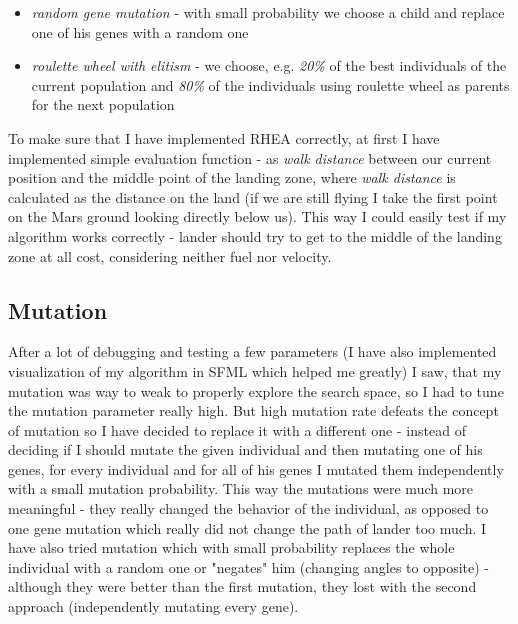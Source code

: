 \documentclass[11pt]{article}
\begin{document}
	\begin{itemize}
		\item \textit{random gene mutation} - with small probability we choose a child and replace one of his genes with a random one
		\item \textit{roulette wheel with elitism} - we choose, e.g. \textit{20\%} of the best individuals of the current population and \textit{80\%} of the individuals using roulette wheel as parents for the next population
	\end{itemize}
	
	To make sure that I have implemented RHEA correctly, at first I have implemented simple evaluation function - as \textit{walk distance} between our current position and the middle point of the landing zone, where \textit{walk distance} is calculated as the distance on the land (if we are still flying I take the first point on the Mars ground looking directly below us). This way I could easily test if my algorithm works correctly - lander should try to get to the middle of the landing zone at all cost, considering neither fuel nor velocity.
	
	\subsection{Mutation}
	
	After a lot of debugging and testing a few parameters (I have also implemented visualization of my algorithm in SFML which helped me greatly) I saw, that my mutation was way to weak to properly explore the search space, so I had to tune the mutation parameter really high. But high mutation rate defeats the concept of mutation so I have decided to replace it with a different one - instead of deciding if I should mutate the given individual and then mutating one of his genes, for every individual and for all of his genes I mutated them independently with a small mutation probability. This way the mutations were much more meaningful - they really changed the behavior of the individual, as opposed to one gene mutation which really did not change the path of lander too much. I have also tried mutation which with small probability replaces the whole individual with a random one or "negates" him (changing angles to opposite) - although they were better than the first mutation, they lost with the second approach (independently mutating every gene).
	
\end{document}
